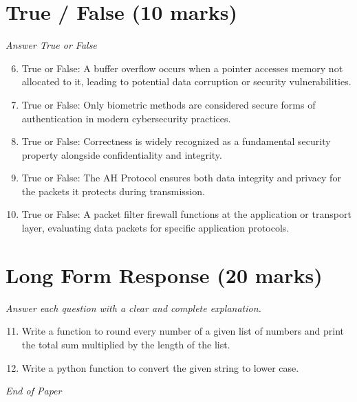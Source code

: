 \documentclass[12pt]{article}
\begin{document}
\section*{True / False (10 marks)}
\textit{Answer True or False}
\begin{enumerate}[label=\arabic*.]
\setcounter{enumi}{5}
\item True or False: A buffer overflow occurs when a pointer accesses memory not allocated to it, leading to potential data corruption or security vulnerabilities.
\item True or False: Only biometric methods are considered secure forms of authentication in modern cybersecurity practices.
\item True or False: Correctness is widely recognized as a fundamental security property alongside confidentiality and integrity.
\item True or False: The AH Protocol ensures both data integrity and privacy for the packets it protects during transmission.
\item True or False: A packet filter firewall functions at the application or transport layer, evaluating data packets for specific application protocols.
\end{enumerate}

\section*{Long Form Response (20 marks)}
\textit{Answer each question with a clear and complete explanation.}
\begin{enumerate}[label=\arabic*.]
\setcounter{enumi}{10}
\item Write a function to round every number of a given list of numbers and print the total sum multiplied by the length of the list.
\item Write a python function to convert the given string to lower case.
\end{enumerate}

\vfill
\noindent\textit{End of Paper}
\end{document}
